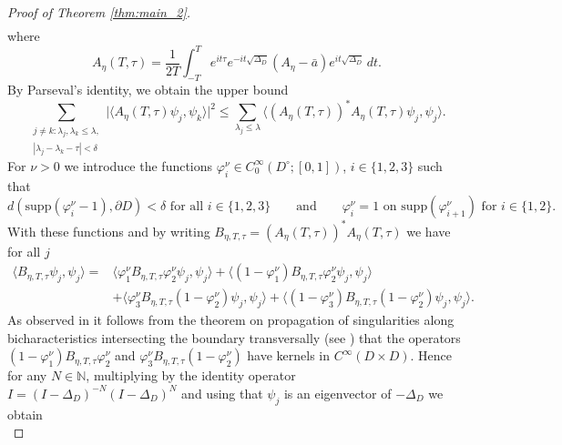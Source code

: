 \documentclass[10pt,a4paper]{amsart}
\newcommand{\N}{\mathbb{N}}
\newcommand{\1}{\mathrm{\mathbf{1}}}
\newcommand{\supp}{\mathrm{supp}}
\numberwithin{equation}{section}
\begin{document}
\begin{proof}[Proof of Theorem \ref{thm:main_2}]
\begin{equation}
\begin{aligned}
    \end{aligned}
\end{equation}
where
\begin{equation*}
    A_\eta(T,\tau) = \frac{1}{2T} \int_{-T}^T e^{it\tau} e^{-i t \sqrt{\Delta_D}} (A_\eta - \bar{a}) e^{i t \sqrt{\Delta_D}} \,dt.
\end{equation*}
By Parseval's identity, we obtain the upper bound  
\begin{equation}\label{EQ_main_prop_3_5}
         \sum_{\substack{j\neq k: \lambda_j,\lambda_k\leq \lambda,  \\ |\lambda_{j}-\lambda_{k}-\tau| < \delta}} \big| \langle A_\eta(T,\tau) \psi_j , \psi_k\rangle  \big|^2 
         \leq \sum_{\lambda_j \leq \lambda} \langle ( A_\eta(T,\tau) )^{*}A_\eta(T,\tau) \psi_j , \psi_j\rangle. 
\end{equation}
For $\nu>0$ we introduce the functions $\varphi_i^\nu \in C_0^\infty(D^{\circ}; [0,1])$, $i\in\{1,2,3\}$ such that
\begin{equation*}
    d(\supp(\varphi_i^\nu -1),\partial D)<\delta \text{ for all $i\in\{1,2,3\}$} \qquad\text{and}\qquad \varphi_i^\nu=1 \text{ on $\supp (\varphi_{i+1}^\nu)$ for $i\in\{1,2\}$}.
\end{equation*} 
With these functions and by writing $B_{\eta,T,\tau} =( A_\eta(T,\tau))^{*}A_\eta(T,\tau) $ we have for all $j$
\begin{equation*}
    \begin{aligned}
    \langle B_{\eta,T,\tau} \psi_j , \psi_j\rangle = {}&  
    \langle \varphi_1^\nu B_{\eta,T,\tau} \varphi_2^\nu \psi_j , \psi_j\rangle
    +\langle (1-\varphi_1^\nu) B_{\eta,T,\tau} \varphi_2^\nu \psi_j , \psi_j\rangle
    \\
    &+\langle \varphi_3^\nu B_{\eta,T,\tau}(1- \varphi_2^\nu) \psi_j , \psi_j\rangle
    +\langle (1-\varphi_3^\nu) B_{\eta,T,\tau}(1- \varphi_2^\nu) \psi_j , \psi_j\rangle.
    \end{aligned}
\end{equation*}
As observed in \cite{ZZ96} it follows from the theorem on propagation of singularities along bicharacteristics intersecting the boundary transversally (see \cite[Theorem 24.2.1]{MR2304165}) that the operators $(1-\varphi_1^\nu) B_{\eta,T,\tau} \varphi_2^\nu $ and $\varphi_3^\nu B_{\eta,T,\tau}(1- \varphi_2^\nu)$ have kernels in $C^\infty(D\times D)$. Hence for any $N\in\N$, multiplying by the identity operator $I=(I-\Delta_D)^{-N}(I-\Delta_D)^{N}$ and using that $\psi_j$ is an eigenvector of $-\Delta_D$ we obtain
\begin{equation}

\end{equation}
\end{proof}
\end{document}
